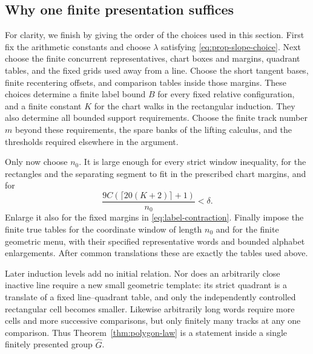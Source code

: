 \subsection{Why one finite presentation suffices}

For clarity, we finish by giving the order of the choices used in
this section.  First fix the arithmetic constants and choose
$\lambda$ satisfying \eqref{eq:prop-slope-choice}.  Next choose the
finite concurrent representatives, chart boxes and margins,
quadrant tables, and the fixed grids used away from a line.
Choose the short tangent bases, finite recentering offsets, and
comparison tables inside those margins.  These choices determine
a finite label bound $B$ for every fixed relative configuration,
and a finite constant $K$ for the chart walks in the rectangular
induction.  They also determine all bounded support requirements.
Choose the finite track number $m$ beyond these requirements,
the spare banks of the lifting calculus, and the thresholds
required elsewhere in the argument.

Only now choose $n_0$.  It is large enough for every strict window
inequality, for the rectangles and the separating segment to fit
in the prescribed chart margins, and for
\[
 \frac{9C(\lceil20(K+2)\rceil+1)}{n_0}<\delta.
\]
Enlarge it also for the fixed margins in
\eqref{eq:label-contraction}.  Finally impose the finite true
tables for the coordinate window of length $n_0$ and for the
finite geometric menu, with their specified representative
words and bounded alphabet enlargements.  After common
translations these are exactly the tables used above.

Later induction levels add no initial relation.  Nor does an
arbitrarily close inactive line require a new small geometric
template: its strict quadrant is a translate of a fixed
line--quadrant table, and only the independently controlled
rectangular cell becomes smaller.  Likewise arbitrarily long
words require more cells and more successive comparisons, but
only finitely many tracks at any one comparison.  Thus
Theorem~\ref{thm:polygon-law} is a statement inside a single
finitely presented group $\widehat G$.
